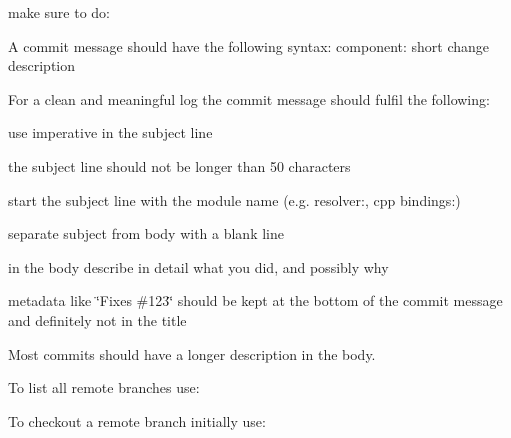 
\begin{DoxyCode}{0}
\end{DoxyCode}


make sure to do\+:


\begin{DoxyCode}{0}
\end{DoxyCode}


A commit message should have the following syntax\+: {\ttfamily component\+: short change description}

For a clean and meaningful log the commit message should fulfil the following\+:


\begin{DoxyItemize}
\item use imperative in the subject line
\item the subject line should not be longer than 50 characters
\item start the subject line with the module name (e.\+g. resolver\+:, cpp bindings\+:)
\item separate subject from body with a blank line
\item in the body describe in detail what you did, and possibly why
\item metadata like \char`\"{}\+Fixes \#123\char`\"{} should be kept at the bottom of the commit message and definitely not in the title
\end{DoxyItemize}

Most commits should have a longer description in the body.

To list all remote branches use\+:


\begin{DoxyCode}{0}
\end{DoxyCode}


To checkout a remote branch initially use\+:


\begin{DoxyCode}{0}
\end{DoxyCode}


